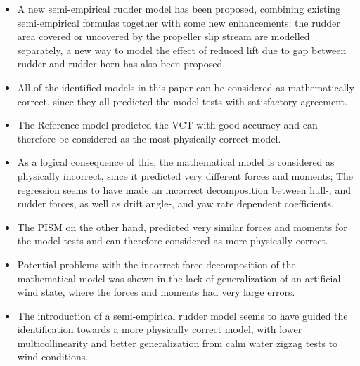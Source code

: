 \begin{itemize}
    \item A new semi-empirical rudder model has been proposed, combining existing semi-empirical formulas together with some new enhancements: the rudder area covered or uncovered by the propeller slip stream are modelled separately, a new way to model the effect of reduced lift due to gap between rudder and rudder horn has also been proposed.     

    \item All of the identified models in this paper can be considered as mathematically correct, since they all predicted the model tests with satisfactory agreement.
    
    \item The Reference model predicted the VCT with good accuracy and can therefore be considered as the most physically correct model.   
    \item As a logical consequence of this, the mathematical model is considered as physically incorrect, since it predicted very different forces and moments; The regression seems to have made an incorrect decomposition between hull-, and rudder forces, as well as drift angle-, and yaw rate dependent coefficients.  
    \item The PISM on the other hand, predicted very similar forces and moments for the model tests and can therefore considered as more physically correct.
    \item Potential problems with the incorrect force decomposition of the mathematical model was shown in the lack of generalization of an artificial wind state, where the forces and moments had very large errors. 
    \item The introduction of a semi-empirical rudder model seems to have guided the identification towards a more physically correct model, with lower multicollinearity and better generalization from calm water zigzag tests to wind conditions. 
\end{itemize}